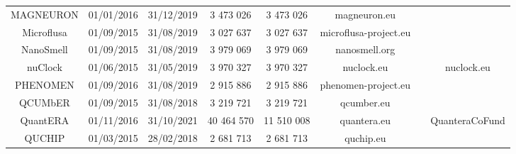 {\begin{landscape}
\begin{adjustwidth}{-3.5cm}{}
{\begin{tabular}{cccccccc}
       MAGNEURON & 01/01/2016 &	31/12/2019 & 3 473 026 & 3 473 026 & magneuron.eu & & \\
       Microflusa & 01/09/2015 & 31/08/2019 & 3 027 637 & 3 027 637 & microflusa-project.eu & & \\
       NanoSmell & 01/09/2015 &	31/08/2019 & 3 979 069 & 3 979 069 & nanosmell.org & & \\
       nuClock & 01/06/2015	& 31/05/2019 & 3 970 327 & 3 970 327 & nuclock.eu & & nuclock.eu \\
       PHENOMEN	& 01/09/2016 & 31/08/2019 & 2 915 886 & 2 915 886 & phenomen-project.eu & & \\
       QCUMbER & 01/09/2015	& 31/08/2018 & 3 219 721 & 3 219 721 & qcumber.eu \\
       QuantERA	& 01/11/2016 & 31/10/2021 & 40 464 570 & 11 510 008	& quantera.eu & & QuanteraCoFund \\
       QUCHIP & 01/03/2015 & 28/02/2018 & 2 681 713 & 2 681 713 & quchip.eu & & \\ 				
       \hline
       \hline
    \end{tabular}
    }
    \end{adjustwidth}
   \end{landscape}
 \clearpage
}

\newpage

